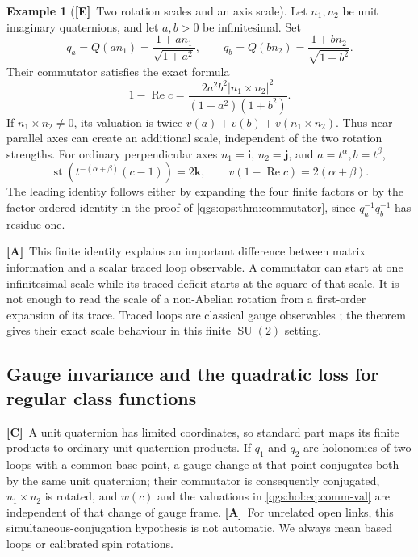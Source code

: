 \documentclass[11pt,oneside]{article}
\numberwithin{equation}{section}
\theoremstyle{plain}
\theoremstyle{definition}
\newtheorem{example}[example]{Example}
\theoremstyle{remark}
\newcommand{\qi}{\mathbf i}
\newcommand{\qj}{\mathbf j}
\newcommand{\qk}{\mathbf k}
\DeclareMathOperator{\st}{st}
\DeclareMathOperator{\Rea}{Re}
\DeclareMathOperator{\SU}{SU}
\newcommand{\abs}[1]{\left|#1\right|}
\newcommand{\TE}{\textcolor{TierE}{\textsf{\bfseries[E]}}}
\newcommand{\TC}{\textcolor{TierC}{\textsf{\bfseries[C]}}}
\newcommand{\TA}{\textcolor{TierA}{\textsf{\bfseries[A]}}}
\begin{document}
\begin{example}[\TE\ Two rotation scales and an axis scale]\label{qgs:ops:ex:axes}
Let $n_1,n_2$ be unit imaginary quaternions, and let $a,b>0$ be infinitesimal. Set
\begin{equation}\label{qgs:ops:eq:axis-rotations}
 q_a=Q(an_1)=\frac{1+an_1}{\sqrt{1+a^2}},\qquad
 q_b=Q(bn_2)=\frac{1+bn_2}{\sqrt{1+b^2}}.
\end{equation}
Their commutator satisfies the exact formula
\begin{equation}\label{qgs:ops:eq:axis-trace}
 1-\Rea c=
 \frac{2a^2b^2\abs{n_1\times n_2}^2}{(1+a^2)(1+b^2)}.
\end{equation}
If $n_1\times n_2\ne0$, its valuation is twice $v(a)+v(b)+v(n_1\times n_2)$. Thus near-parallel axes can create an additional scale, independent of the two rotation strengths. For ordinary perpendicular axes $n_1=\qi$, $n_2=\qj$, and $a=t^\alpha,b=t^\beta$,
\begin{equation}\label{qgs:ops:eq:leading-comm}
 \st\!\left(t^{-(\alpha+\beta)}(c-1)\right)=2\qk,
 \qquad v(1-\Rea c)=2(\alpha+\beta).
\end{equation}
The leading identity follows either by expanding the four finite factors or by the factor-ordered identity in the proof of \cref{qgs:ops:thm:commutator}, since $q_a^{-1}q_b^{-1}$ has residue one.
\end{example}

\TA\ This finite identity explains an important difference between matrix information and a scalar traced loop observable. A commutator can start at one infinitesimal scale while its traced deficit starts at the square of that scale. It is not enough to read the scale of a non-Abelian rotation from a first-order expansion of its trace. Traced loops are classical gauge observables \cite{Wilson}; the theorem gives their exact scale behaviour in this finite $\SU(2)$ setting.

\subsection{Gauge invariance and the quadratic loss for regular class functions}
\TC\ A unit quaternion has limited coordinates, so standard part maps its finite products to ordinary unit-quaternion products. If $q_1$ and $q_2$ are holonomies of two loops with a common base point, a gauge change at that point conjugates both by the same unit quaternion; their commutator is consequently conjugated, $u_1\times u_2$ is rotated, and $w(c)$ and the valuations in \eqref{qgs:hol:eq:comm-val} are independent of that change of gauge frame. \TA\ For unrelated open links, this simultaneous-conjugation hypothesis is not automatic. We always mean based loops or calibrated spin rotations.
\end{document}
